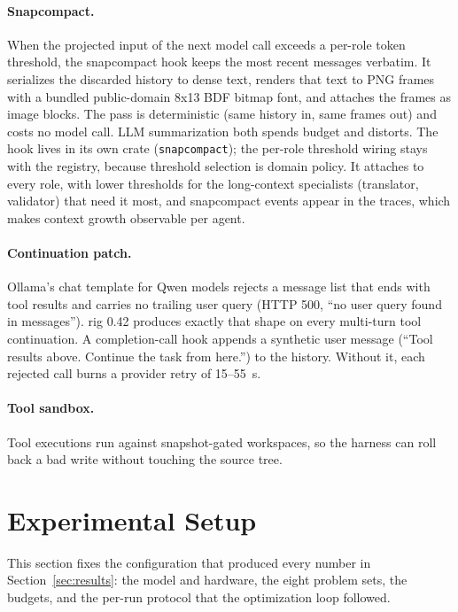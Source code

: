\documentclass[11pt]{article}
\begin{document}
\paragraph{Snapcompact.}
When the projected input of the next model call exceeds a per-role token
threshold, the snapcompact hook keeps the most recent messages verbatim.
It serializes the discarded history to dense text, renders that text to
PNG frames with a bundled public-domain 8x13 BDF bitmap font, and
attaches the frames as image blocks. The pass is deterministic (same
history in, same frames out) and costs no model call. LLM summarization
both spends budget and distorts. The hook lives in its own crate
(\texttt{snapcompact}); the per-role threshold wiring stays with the
registry, because threshold selection is domain policy. It attaches to
every role, with lower thresholds for the long-context specialists
(translator, validator) that need it most, and snapcompact events appear
in the traces, which makes context growth observable per agent.

\paragraph{Continuation patch.}
Ollama's chat template for Qwen models rejects a message list that ends
with tool results and carries no trailing user query (HTTP 500, ``no user
query found in messages''). rig 0.42 produces exactly that shape on every
multi-turn tool continuation. A completion-call hook appends a synthetic
user message (``Tool results above. Continue the task from here.'') to
the history. Without it, each rejected call burns a provider retry of
15--55~s.

\paragraph{Tool sandbox.}
Tool executions run against snapshot-gated workspaces, so the harness
can roll back a bad write without touching the source tree.

\section{Experimental Setup}
\label{sec:setup}

This section fixes the configuration that produced every number in
Section~\ref{sec:results}: the model and hardware, the eight problem
sets, the budgets, and the per-run protocol that the optimization loop
followed.
\end{document}
